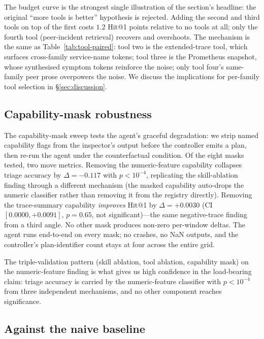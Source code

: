 The budget curve is the strongest single illustration of the section's headline: the original ``more tools is better'' hypothesis is rejected. Adding the second and third tools on top of the first costs $1.2$ Hit@1 points relative to no tools at all; only the fourth tool (peer-incident retrieval) recovers and overshoots. The mechanism is the same as Table~\ref{tab:tool-paired}: tool two is the extended-trace tool, which surfaces cross-family service-name tokens; tool three is the Prometheus snapshot, whose synthesised symptom tokens reinforce the noise; only tool four's same-family peer prose overpowers the noise. We discuss the implications for per-family tool selection in \S\ref{sec:discussion}.

\subsection{Capability-mask robustness}
\label{sec:results:capmask}

The capability-mask sweep tests the agent's graceful degradation: we strip named capability flags from the inspector's output before the controller emits a plan, then re-run the agent under the counterfactual condition. Of the eight masks tested, two move metrics. Removing the numeric-feature capability collapses triage accuracy by $\Delta = -0.117$ with $p < 10^{-4}$, replicating the skill-ablation finding through a different mechanism (the masked capability auto-drops the numeric classifier rather than removing it from the registry directly). Removing the trace-summary capability \emph{improves} Hit@1 by $\Delta = +0.0030$ (CI $[0.0000, +0.0091]$, $p = 0.65$, not significant)---the same negative-trace finding from a third angle. No other mask produces non-zero per-window deltas. The agent runs end-to-end on every mask; no crashes, no NaN outputs, and the controller's plan-identifier count stays at four across the entire grid.

The triple-validation pattern (skill ablation, tool ablation, capability mask) on the numeric-feature finding is what gives us high confidence in the load-bearing claim: triage accuracy is carried by the numeric-feature classifier with $p < 10^{-4}$ from three independent mechanisms, and no other component reaches significance.

\subsection{Against the naive baseline}
\label{sec:results:bm25}

